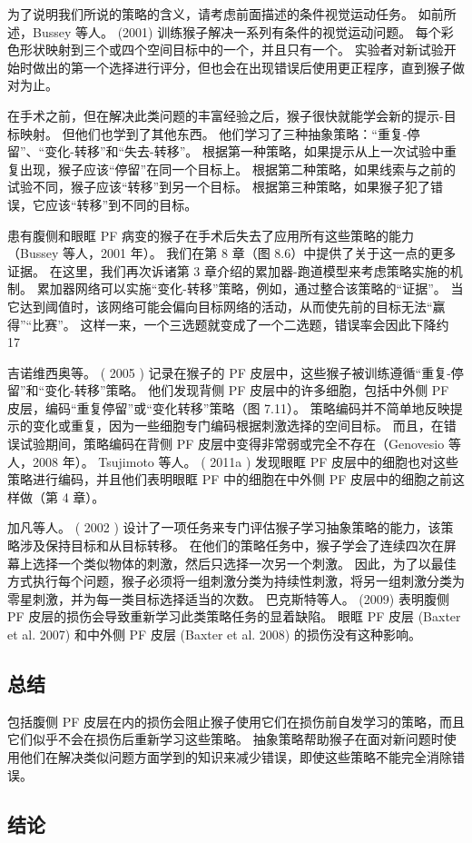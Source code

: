 为了说明我们所说的策略的含义，请考虑前面描述的条件视觉运动任务。 
如前所述，Bussey 等人。 (2001) 训练猴子解决一系列有条件的视觉运动问题。 
每个彩色形状映射到三个或四个空间目标中的一个，并且只有一个。 
实验者对新试验开始时做出的第一个选择进行评分，但也会在出现错误后使用更正程序，直到猴子做对为止。
\par 
 在手术之前，但在解决此类问题的丰富经验之后，猴子很快就能学会新的提示-目标映射。 
 但他们也学到了其他东西。 他们学习了三种抽象策略：“重复-停留”、“变化-转移”和“失去-转移”。 
 根据第一种策略，如果提示从上一次试验中重复出现，猴子应该“停留”在同一个目标上。 
 根据第二种策略，如果线索与之前的试验不同，猴子应该“转移”到另一个目标。 
 根据第三种策略，如果猴子犯了错误，它应该“转移”到不同的目标。	
\par 
患有腹侧和眼眶 PF 病变的猴子在手术后失去了应用所有这些策略的能力（Bussey 等人，2001 年）。 
我们在第 8 章（图 8.6）中提供了关于这一点的更多证据。 
在这里，我们再次诉诸第 3 章介绍的累加器-跑道模型来考虑策略实施的机制。 
累加器网络可以实施“变化-转移”策略，例如，通过整合该策略的“证据”。 当它达到阈值时，该网络可能会偏向目标网络的活动，从而使先前的目标无法“赢得”“比赛”。 
这样一来，一个三选题就变成了一个二选题，错误率会因此下降约 17%
\par 
吉诺维西奥等。 ( 2005 ) 记录在猴子的 PF 皮层中，这些猴子被训练遵循“重复-停留”和“变化-转移”策略。 
他们发现背侧 PF 皮层中的许多细胞，包括中外侧 PF 皮层，编码“重复停留”或“变化转移”策略（图 7.11）。 
策略编码并不简单地反映提示的变化或重复，因为一些细胞专门编码根据刺激选择的空间目标。 
而且，在错误试验期间，策略编码在背侧 PF 皮层中变得非常弱或完全不存在（Genovesio 等人，2008 年）。 
Tsujimoto 等人。 ( 2011a ) 发现眼眶 PF 皮层中的细胞也对这些策略进行编码，并且他们表明眼眶 PF 中的细胞在中外侧 PF 皮层中的细胞之前这样做（第 4 章）。
\par 
加凡等人。 ( 2002 ) 设计了一项任务来专门评估猴子学习抽象策略的能力，该策略涉及保持目标和从目标转移。 
在他们的策略任务中，猴子学会了连续四次在屏幕上选择一个类似物体的刺激，然后只选择一次另一个刺激。 
因此，为了以最佳方式执行每个问题，猴子必须将一组刺激分类为持续性刺激，将另一组刺激分类为零星刺激，并为每一类目标选择适当的次数。 
巴克斯特等人。 (2009) 表明腹侧 PF 皮层的损伤会导致重新学习此类策略任务的显着缺陷。 
眼眶 PF 皮层 (Baxter et al. 2007) 和中外侧 PF 皮层 (Baxter et al. 2008) 的损伤没有这种影响。
\subsection{总结}
\par 
包括腹侧 PF 皮层在内的损伤会阻止猴子使用它们在损伤前自发学习的策略，而且它们似乎不会在损伤后重新学习这些策略。 
抽象策略帮助猴子在面对新问题时使用他们在解决类似问题方面学到的知识来减少错误，即使这些策略不能完全消除错误。
\subsection{结论}


